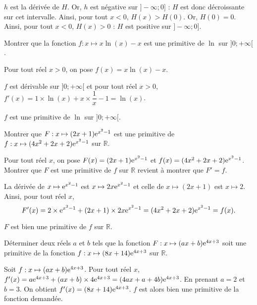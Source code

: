 \documentclass[11pt,fleqn, openany]{book} %
\begin{document}
\begin{solution}$h$ est la dérivée de $H$. Or, $h$ est négative sur $]-\infty ;0]$  : $H$ est donc décroissante sur cet intervalle. Ainsi, pour tout $x<0$, $H(x)>H(0)$. Or, $H(0)=0$. Ainsi, pour tout $x<0$, $H(x)>0$ : $H$ est positive sur $]-\infty ;0]$.\end{solution}



\begin{exercise}Montrer que la fonction $f:x\mapsto x\ln(x)-x$ est une primitive de $\ln$ sur $]0;+\infty [$.\end{exercise}

\begin{solution}Pour tout réel \(x>0\), on pose \(f(x)=x\ln(x)-x\). 

\(f\) est dérivable sur \(]0;+\infty [\) et pour tout réel \(x>0\), $f'(x)=1 \times \ln(x) + x \times \dfrac{1}{x}-1=\ln(x)$.

\(f\) est une primitive de \(\ln\) sur \(]0;+\infty [\).
 \end{solution}
 
 

\begin{exercise}Montrer que $F:x\mapsto (2x+1)\mathrm{e}^{x^2-1}$ est une primitive de $f:x\mapsto (4x^2+2x+2)\mathrm{e}^{x^2-1}$ sur $\mathbb{R}$.\end{exercise}

\begin{solution} Pour tout réel \(x\), on pose \(F(x)=(2x+1)\mathrm{e}^{x^2-1}\) et \(f(x)=(4x^2+2x+2)\mathrm{e}^{x^2-1}\). Montrer que \(F\) est une primitive de \(f\) sur \(\mathbb{R}\) revient à montrer que \(F'=f\).

La dérivée de \(x\mapsto \mathrm{e}^{x^2-1}\) est \(x\mapsto 2x\mathrm{e}^{x^2-1}\) et celle de \(x\mapsto (2x+1)\) est \(x\mapsto 2\). Ainsi, pour tout réel \(x\),
\[F'(x)=2 \times \mathrm{e}^{x^2-1} + (2x+1) \times 2x\mathrm{e}^{x^2-1}=(4x^2+2x+2)\mathrm{e}^{x^2-1}=f(x).\]

\(F\) est bien une primitive de \(f\) sur \(\mathbb{R}\).
 \end{solution}
 
 

\begin{exercise}Déterminer deux réels $a$ et $b$ tels que la fonction $F:x\mapsto (ax+b)\mathrm{e}^{4x+3}$ soit une primitive de la fonction $f:x\mapsto (8x+14)\mathrm{e}^{4x+3}$ sur $\mathbb{R}$.\end{exercise}

\begin{solution}

Soit \(f:x\mapsto (ax+b)\mathrm{e}^{4x+3}\). Pour tout réel \(x\), \(f'(x)=a\mathrm{e}^{4x+3}+(ax+b)\times 4\mathrm{e}^{4x+3}=(4ax+a+4b)\mathrm{e}^{4x+3}\). En prenant \(a=2\) et \(b=3\). On obtient \(f'(x)=(8x+14)\mathrm{e}^{4x+3}\). \(f\) est alors bien une primitive de la fonction demandée.

  \end{solution}
  
\end{document}
